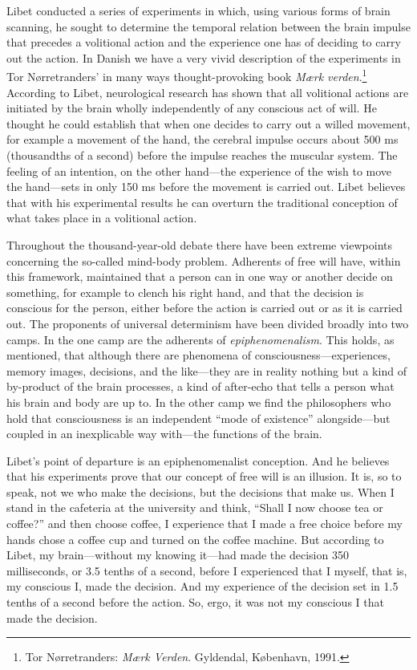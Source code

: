 \documentclass[12pt,a4paper]{book}
\begin{document}
Libet conducted a series of experiments in which, using various forms of brain scanning, he sought to determine the temporal relation between the brain impulse that precedes a volitional action and the experience one has of deciding to carry out the action. In Danish we have a very vivid description of the experiments in Tor Nørretranders' in many ways thought-provoking book \emph{Mærk verden}.\footnote{Tor Nørretranders: \emph{Mærk Verden}. Gyldendal, København, 1991.} According to Libet, neurological research has shown that all volitional actions are initiated by the brain wholly independently of any conscious act of will. He thought he could establish that when one decides to carry out a willed movement, for example a movement of the hand, the cerebral impulse occurs about 500 ms (thousandths of a second) before the impulse reaches the muscular system. The feeling of an intention, on the other hand---the experience of the wish to move the hand---sets in only 150 ms before the movement is carried out. Libet believes that with his experimental results he can overturn the traditional conception of what takes place in a volitional action.

Throughout the thousand-year-old debate there have been extreme viewpoints concerning the so-called mind-body problem. Adherents of free will have, within this framework, maintained that a person can in one way or another decide on something, for example to clench his right hand, and that the decision is conscious for the person, either before the action is carried out or as it is carried out. The proponents of universal determinism have been divided broadly into two camps. In the one camp are the adherents of \emph{epiphenomenalism}. This holds, as mentioned, that although there are phenomena of consciousness---experiences, memory images, decisions, and the like---they are in reality nothing but a kind of by-product of the brain processes, a kind of after-echo that tells a person what his brain and body are up to. In the other camp we find the philosophers who hold that consciousness is an independent ``mode of existence'' alongside---but coupled in an inexplicable way with---the functions of the brain.

Libet's point of departure is an epiphenomenalist conception. And he believes that his experiments prove that our concept of free will is an illusion. It is, so to speak, not we who make the decisions, but the decisions that make us. When I stand in the cafeteria at the university and think, ``Shall I now choose tea or coffee?'' and then choose coffee, I experience that I made a free choice before my hands chose a coffee cup and turned on the coffee machine. But according to Libet, my brain---without my knowing it---had made the decision 350 milliseconds, or 3.5 tenths of a second, before I experienced that I myself, that is, my conscious I, made the decision. And my experience of the decision set in 1.5 tenths of a second before the action. So, ergo, it was not my conscious I that made the decision.
\end{document}
